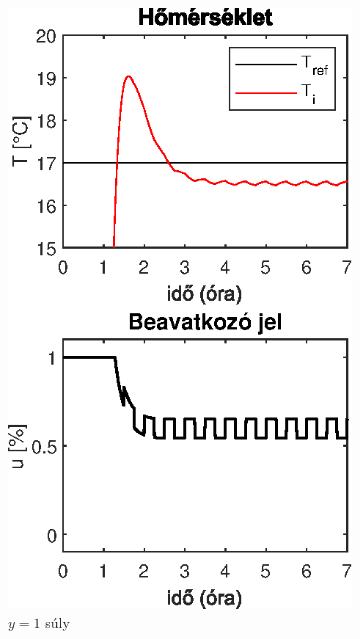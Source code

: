 \begin{figure}[H]
	\begin{subfigure}[t]{0.32\textwidth}
		\centering
		\includegraphics[width=\textwidth]{figures/realsys/mpc-wy-1}
		\caption{$y=1$ súly}
		\label{fig:mpc-wy-1}
	\end{subfigure}
	~
	\begin{subfigure}[t]{0.32\textwidth}
		\centering

\end{subfigure}
\end{figure}
